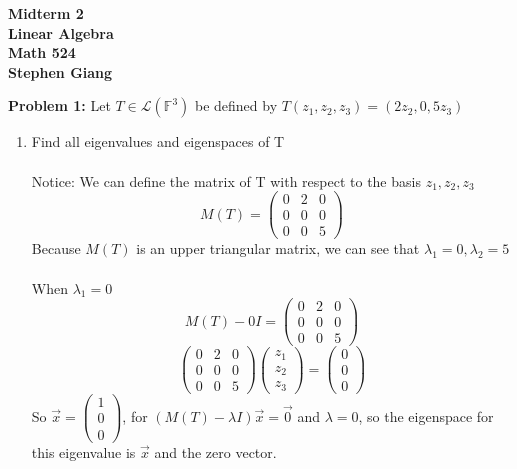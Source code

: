 \documentclass[12pt]{article}
\begin{document}
	
	\begin{center}
		\textbf{Midterm 2} \\
		\textbf{Linear Algebra} \\
		\textbf{Math 524} \\
		\textbf{Stephen Giang} \\
	\end{center}

\noindent \textbf{Problem 1: }Let $T \in \mathcal{L}(\mathbb{F}^3)$ be defined by $T(z_1,z_2,z_3) = (2z_2,0,5z_3)$
	\begin{enumerate}[label = (\alph*)]
		\item Find all eigenvalues and eigenspaces of T
		\\ \\
		Notice: 
		We can define the matrix of T with respect to the basis $z_1, z_2, z_3$
		$$ 
		M(T) = 
			\begin{pmatrix}
			0 & 2 & 0 \\
			0 & 0 & 0 \\
			0 & 0 & 5
			\end{pmatrix}
		$$
		Because $M(T)$ is an upper triangular matrix, we can see that $\lambda_1 = 0, \lambda_2 = 5$ \\ \\
		When $\lambda_1 = 0$
		$$
		M(T) - 0I = 
			\begin{pmatrix}
				0 & 2 & 0 \\
				0 & 0 & 0 \\
				0 & 0 & 5
			\end{pmatrix}
		$$
		$$
		\begin{pmatrix}
		0 & 2 & 0 \\
		0 & 0 & 0 \\
		0 & 0 & 5
		\end{pmatrix}
		\begin{pmatrix}
			z_1 \\
			z_2 \\
			z_3
		\end{pmatrix}
		= 
		\begin{pmatrix}
		0 \\
		0 \\
		0
		\end{pmatrix}
		$$
		So $\vec{x} = \begin{pmatrix}
			1 \\
			0 \\
			0
		\end{pmatrix}$, for $(M(T) - \lambda I)\vec{x} = \vec{0}$ and $\lambda = 0$, so the eigenspace for this eigenvalue is $\vec{x}$ and the zero vector. \\ \\

\end{enumerate}
\end{document}
